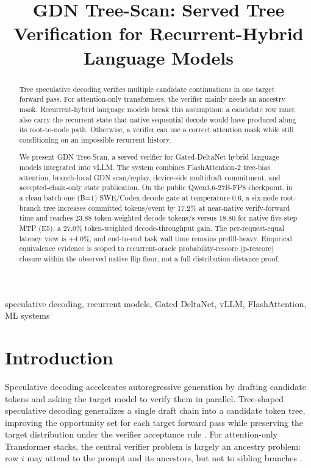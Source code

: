 \documentclass[conference]{IEEEtran}
\newcommand{\sys}{GDN Tree-Scan}
\begin{document}
\title{GDN Tree-Scan: Served Tree Verification for Recurrent-Hybrid Language Models}

\author{
}

\maketitle

\begin{abstract}
Tree speculative decoding verifies multiple candidate continuations in one target forward pass. For attention-only transformers, the verifier mainly needs an ancestry mask. Recurrent-hybrid language models break this assumption: a candidate row must also carry the recurrent state that native sequential decode would have produced along its root-to-node path. Otherwise, a verifier can use a correct attention mask while still conditioning on an impossible recurrent history.

We present \sys{}, a served verifier for Gated-DeltaNet hybrid language models integrated into vLLM. The system combines FlashAttention-2 tree-bias attention, branch-local GDN scan/replay, device-side multidraft commitment, and accepted-chain-only state publication. On the public Qwen3.6-27B-FP8 checkpoint, in a clean batch-one (B=1) SWE/Codex decode gate at temperature 0.6, a six-node root-branch tree increases committed tokens/event by 17.2\% at near-native verify-forward time and reaches 23.88 token-weighted decode tokens/s versus 18.80 for native five-step MTP (E5), a 27.0\% token-weighted decode-throughput gain. The per-request-equal latency view is +4.0\%, and end-to-end task wall time remains prefill-heavy. Empirical equivalence evidence is scoped to recurrent-oracle probability-rescore (p-rescore) closure within the observed native flip floor, not a full distribution-distance proof.
\end{abstract}

\begin{IEEEkeywords}
speculative decoding, recurrent models, Gated DeltaNet, vLLM, FlashAttention, ML systems
\end{IEEEkeywords}

\section{Introduction}

Speculative decoding accelerates autoregressive generation by drafting candidate tokens and asking the target model to verify them in parallel. Tree-shaped speculative decoding generalizes a single draft chain into a candidate token tree, improving the opportunity set for each target forward pass while preserving the target distribution under the verifier acceptance rule \cite{miao2023specinfer,chen2024sequoia,li2024eagle,wang2024opt}. For attention-only Transformer stacks, the central verifier problem is largely an ancestry problem: row \(i\) may attend to the prompt and its ancestors, but not to sibling branches \cite{miao2023specinfer,li2024eagle}.
\end{document}
